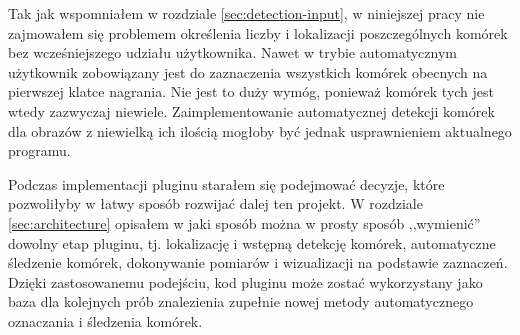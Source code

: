 \documentclass[declaration,shortabstract,mgr]{iithesis}
\begin{document}
Tak jak wspomniałem w rozdziale \ref{sec:detection-input}, w niniejszej pracy nie zajmowałem się problemem określenia liczby i lokalizacji poszczególnych komórek bez wcześniejszego udziału użytkownika.
Nawet w trybie automatycznym użytkownik zobowiązany jest do zaznaczenia wszystkich komórek obecnych na pierwszej klatce nagrania.
Nie jest to duży wymóg, ponieważ komórek tych jest wtedy zazwyczaj niewiele.
Zaimplementowanie automatycznej detekcji komórek dla obrazów z niewielką ich ilością mogłoby być jednak usprawnieniem aktualnego programu.

Podczas implementacji pluginu starałem się podejmować decyzje, które pozwoliłyby w łatwy sposób rozwijać dalej ten projekt.
W rozdziale \ref{sec:architecture} opisałem w jaki sposób można w prosty sposób ,,wymienić'' dowolny etap pluginu, tj. lokalizację i wstępną detekcję komórek, automatyczne śledzenie komórek, dokonywanie pomiarów i wizualizacji na podstawie zaznaczeń.
Dzięki zastosowanemu podejściu, kod pluginu może zostać wykorzystany jako baza dla kolejnych prób znalezienia zupełnie nowej metody automatycznego oznaczania i śledzenia komórek.






\end{document}
